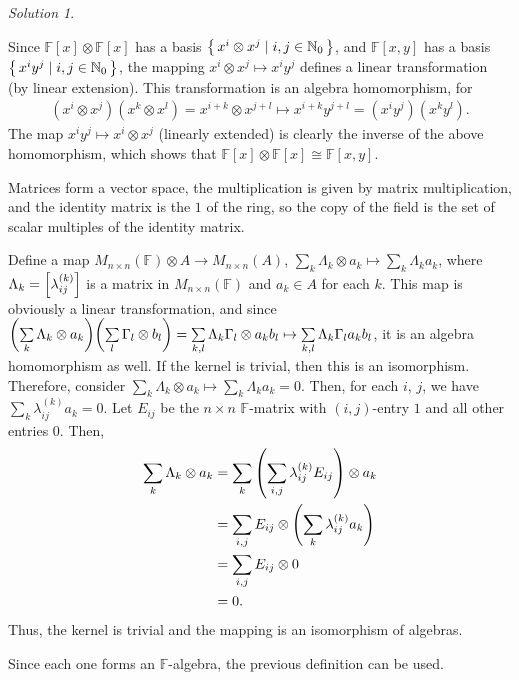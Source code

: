 \documentclass{article}
\theoremstyle{definition}
\theoremstyle{remark}
\newtheorem*{Solution*}{Solution}
\theoremstyle{underline}
\theoremstyle{underline}
\begin{document}
	\begin{Solution*}
		\begin{subquests}
			\item Since $\mathbb F[x] \otimes \mathbb F[x]$ has a basis $\qty{\, x^i \otimes x^j \mid i, j \in \mathbb N_0 \,}$, and $\mathbb F[x, y]$ has a basis $\qty{\, x^i y^j \mid i, j \in \mathbb N_0 \,}$, the mapping $x^i \otimes x^j \mapsto x^i y^j$ defines a linear transformation (by linear extension). This transformation is an algebra homomorphism, for
			\begin{gather*}
			(x^i \otimes x^j) (x^k \otimes x^l) = x^{i + k} \otimes x^{j + l} \mapsto x^{i + k} y^{j + l} = (x^i y^j) (x^k y^l).
			\end{gather*}
			The map $x^i y^j \mapsto x^i \otimes x^j$ (linearly extended) is clearly the inverse of the above homomorphism, which shows that $\mathbb F[x] \otimes \mathbb F[x] \cong \mathbb F[x, y]$.
			\item Matrices form a vector space, the multiplication is given by matrix multiplication, and the identity matrix is the $1$ of the ring, so the copy of the field is the set of scalar multiples of the identity matrix.
			
			Define a map $M_{n \times n} (\mathbb F) \otimes A \to M_{n \times n}(A)$, $\sum\limits_k \Lambda_k \otimes a_k \mapsto \sum\limits_k \Lambda_k a_k$, where $\Lambda_k = \bqty{\lambda^{(k)}_{ij}}$ is a matrix in $M_{n \times n}(\mathbb F)$ and $a_k \in A$ for each $k$. This map is obviously a linear transformation, and since $\pqty{\sum\limits_k \Lambda_k \otimes a_k}\pqty{\sum\limits_l \Gamma_l \otimes b_l} = \sum\limits_{k, l} \Lambda_k \Gamma_l \otimes a_k b_l \mapsto \sum\limits_{k, l} \Lambda_k \Gamma_l a_k b_l$, it is an algebra homomorphism as well. If the kernel is trivial, then this is an isomorphism. Therefore, consider $\sum\limits_k \Lambda_k \otimes a_k \mapsto \sum\limits_k \Lambda_k a_k = 0$. Then, for each $i$, $j$, we have $\sum\limits_k \lambda^{(k)}_{ij} a_k = 0$. Let $E_{ij}$ be the $n \times n$ $\mathbb F$-matrix with $(i,j)$-entry $1$ and all other entries $0$. Then,
			\begin{align*}
				\sum_k \Lambda_k \otimes a_k & = \sum_k \pqty{\sum_{i,j} \lambda^{(k)}_{ij} E_{ij}} \otimes a_k\\
					& = \sum_{i,j} E_{ij} \otimes \pqty{\sum_k \lambda^{(k)}_{ij} a_k}\\
					& = \sum_{i, j} E_{ij} \otimes 0\\
					& = 0.
			\end{align*}
			Thus, the kernel is trivial and the mapping is an isomorphism of algebras.
			\item Since each one forms an $\mathbb F$-algebra, the previous definition can be used.
		\end{subquests}
	\end{Solution*}
\end{document}
